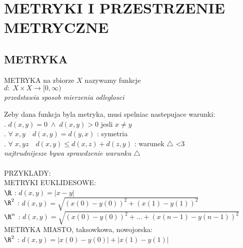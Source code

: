 \documentclass{article}
\begin{document}
\ttfamily
\section*{METRYKI I PRZESTRZENIE METRYCZNE}
\subsection*{METRYKA}
    \begin{center}\large
        \color{def}METRYKA \color{txt}na zbiorze $X$ nazywamy funkcje\smallskip\\
        $d:\;X\times X\to[0, \infty)$\smallskip\\
        \emph{przedstawia sposob mierzenia odleglosci}
    \end{center}
    
    Zeby dana \color{emp}funkcja byla metryka\color{txt}, musi spelniac nastepujace \color{emp}warunki\color{txt}:\smallskip\\ 
        . $d(x,y)=0\;\land\;d(x,y)>0$ jesli $x\neq y$\smallskip\\
        . $\forall\;x,y\quad d(x, y)=d(y,x)$ : symetria\smallskip\\
        . $\forall\;x,yz\quad d(x,y)\leq d(x,z)+d(z,y)$ : warunek $\triangle$ <3\medskip\\
    \indent \emph{najtrudnijesze bywa sprawdzenie warunku $\triangle$}\bigskip\\

    \bigskip\\
    \Large\color{emp}PRZYKLADY:\color{txt}\normalsize\bigskip\\

    \color{def}METRYKI EUKLIDESOWE:\color{txt}\medskip\\
        $\R$ : $d(x, y)=|x-y|$\smallskip\\
        $\R^2$ : $d(x, y)=\sqrt{(x(0)-y(0))^2+(x(1)-y(1))^2}$\smallskip\\
        $\R^n$ : $d(x, y)=\sqrt{(x(0)-y(0))^2+...+(x(n-1)-y(n-1))^2}$\bigskip\\

    \color{def}METRYKA MIASTO\color{txt}, taksowkowa, nowojorska:\smallskip\\
        $\R^2$ : $d(x,y)=|x(0)-y(0)|+|x(1)-y(1)|$\\
        \begin{center}\end{center}\bigskip
\end{document}
